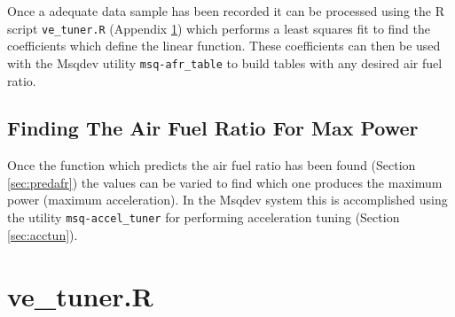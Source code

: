 \documentclass{article}
\begin{document}
Once a adequate data sample has been recorded it can be processed 
using the R script \verb+ve_tuner.R+ (Appendix \ref{app:vetuner})
which performs a least squares fit to find the coefficients which define
the linear function.
These coefficients can then be used with the Msqdev utility \verb+msq-afr_table+
to build tables with any desired air fuel ratio.

\FloatBarrier  %

\subsection{Finding The Air Fuel Ratio For Max Power}
\label{sec:findafrpow}

Once the function which predicts the air fuel ratio has been found
(Section \ref{sec:predafr}) the values can be varied to find which
one produces the maximum power (maximum acceleration).
In the Msqdev system this is accomplished using the utility
\verb+msq-accel_tuner+ for performing acceleration tuning (Section \ref{sec:acctun}).

\appendix
\section{ve\_tuner.R}
\label{app:vetuner}



\pagebreak


%
%
%

\end{document}
